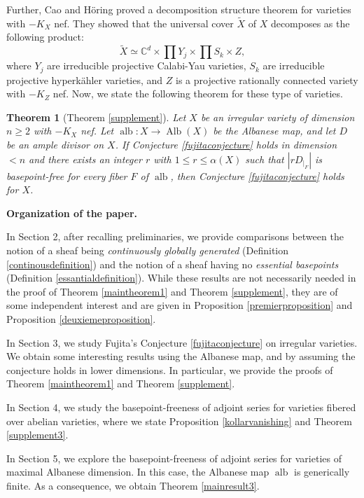 \documentclass[sn-mathphys-num]{sn-jnl}%
\newcommand{\C}{\mathbb{C}}
\newtheorem*{theorem*}{Theorem}
\theoremstyle{definition}
\numberwithin{equation}{section}
\begin{document}
Further, Cao and Höring \cite[Theorem 1.4]{caohoring} proved a decomposition structure theorem for varieties with $-K_{X}$ nef. They showed that the universal cover $\widetilde{X}$ of $X$ decomposes as the following product:
\[
\widetilde{X} \simeq \C^{d} \times \prod Y_{j} \times \prod S_{k} \times Z,
\]
where $Y_{j}$ are irreducible projective Calabi-Yau varieties, $S_{k}$ are irreducible projective hyperkähler varieties, and $Z$ is a projective rationally connected variety with $-K_{Z}$ nef. Now, we state the following theorem for these type of varieties. 
\begin{theorem*}[Theorem \ref{supplement}]
Let $X$ be an irregular variety of dimension $n \geq 2$ with $-K_{X}$ nef. Let $\operatorname{alb}: X \to  \operatorname{Alb}(X)$ be the Albanese map, and let $D$ be an ample divisor on $X$. If Conjecture \ref{fujitaconjecture} holds in dimension $<n$ and there exists an integer $r$ with $1\leq r \leq \alpha(X)$ such that $|rD_{|_{F}}|$ is basepoint-free for every fiber $F$ of $\operatorname{alb}$, then Conjecture \ref{fujitaconjecture} holds for $X$.
\end{theorem*}
\textbf{}

\textbf{Organization of the paper.}
\par In Section 2, after recalling preliminaries, we provide  comparisons between the notion of a sheaf being \emph{continuously globally generated} (Definition \ref{continousdefinition}) and the notion of a sheaf  having no \emph{essential basepoints} (Definition \ref{essantialdefinition}). While these results are not necessarily needed in the proof of Theorem \ref{maintheorem1} and Theorem \ref{supplement}, they are of some independent interest and are given in Proposition \ref{premierproposition} and Proposition \ref{deuxiemeproposition}. 
\par In Section 3, we study Fujita's Conjecture \ref{fujitaconjecture} on irregular varieties. We obtain some interesting results  using the Albanese map, and by assuming the conjecture holds in lower dimensions. In particular, we provide the proofs of Theorem \ref{maintheorem1} and Theorem \ref{supplement}.
    \par In Section 4, we  study the basepoint-freeness of adjoint series for varieties
fibered over abelian varieties, where we state Proposition \ref{kollarvanishing} and Theorem \ref{supplement3}.
\par In Section 5, we explore the basepoint-freeness of adjoint series for varieties
of maximal Albanese dimension. In this case, the Albanese map $\operatorname{alb}$ is generically finite. As a consequence, we obtain Theorem \ref{mainresult3}.
\end{document}

